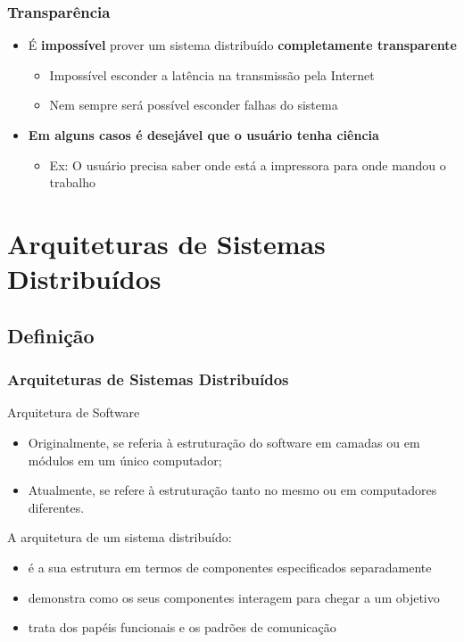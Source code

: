 \documentclass[hyperref={pdfpagelabels=false},table]{beamer}
\begin{document}
\begin{frame}[wide]
	\frametitle{Transparência}
	\begin{itemize}
		\item É \textbf{impossível} prover um sistema distribuído \textbf{completamente transparente}
		\begin{itemize}
			\item Impossível esconder a latência na transmissão pela Internet
			\item Nem sempre será possível esconder falhas do sistema
		\end{itemize}
		\item \textbf{Em alguns casos é desejável que o usuário tenha ciência}
		\begin{itemize}
			\item Ex: O usuário precisa saber onde está a impressora para onde mandou o trabalho
		\end{itemize}
	\end{itemize}
\end{frame}



\section{Arquiteturas de Sistemas Distribuídos}
\subsection{Definição}
\begin{frame}[t]
	\frametitle{Arquiteturas de Sistemas Distribuídos}
	\begin{block}{Arquitetura de Software}
		\begin{itemize}
			\item Originalmente, se referia à estruturação do software em camadas ou em módulos em um único computador;
			\item Atualmente, se refere à estruturação tanto no mesmo ou em computadores diferentes.
		\end{itemize}
	\end{block}

	\begin{block}{A arquitetura de um sistema distribuído:}
		\begin{itemize}
			\item é a sua estrutura em termos de componentes especificados separadamente 
			\item demonstra como os seus componentes interagem para chegar a um objetivo
			\item trata dos papéis funcionais e os padrões de comunicação
		\end{itemize}
	\end{block}
\end{frame}
\end{document}
